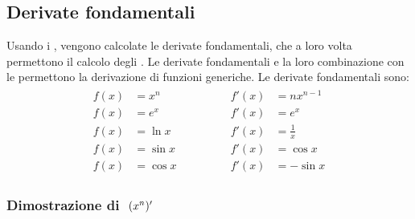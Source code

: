\documentclass[letterpaper,10pt,english]{jupyterBook}
\begin{document}
\subsection{Derivate fondamentali}
\label{\detokenize{ch/infinitesimal_calculus/derivatives:derivate-fondamentali}}\label{\detokenize{ch/infinitesimal_calculus/derivatives:infinitesimal-calculus-derivatives-fund}}
\sphinxAtStartPar
Usando i {\hyperref[\detokenize{ch/infinitesimal_calculus/analysis:infinitesimal-calculus-limits-fund}]{}}, vengono calcolate le derivate fondamentali, che a loro volta permettono il calcolo degli {\hyperref[\detokenize{ch/infinitesimal_calculus/integrals:infinitesimal-calculus-integrals-fund}]{}}. Le derivate fondamentali e la loro combinazione con le {\hyperref[\detokenize{ch/infinitesimal_calculus/derivatives:infinitesimal-calculus-derivatives-rules}]{}} permettono la derivazione di funzioni generiche. Le derivate fondamentali sono:
\begin{equation}\label{equation:ch/infinitesimal_calculus/derivatives:eq:infinitesimal-calculus:derivatives:fund}
\begin{split}\begin{aligned}
f(x) & = x^n    \qquad & \qquad f'(x) & = n x^{n-1}   \\ 
f(x) & = e^x    \qquad & \qquad f'(x) & = e^x         \\ 
f(x) & = \ln x  \qquad & \qquad f'(x) & = \frac{1}{x} \\ 
f(x) & = \sin x \qquad & \qquad f'(x) & = \cos x      \\ 
f(x) & = \cos x \qquad & \qquad f'(x) & =-\sin x         
\end{aligned}\end{split}
\end{equation}\subsubsection*{Dimostrazione di \protect\(\ (x^n)'\protect\)}
\end{document}
